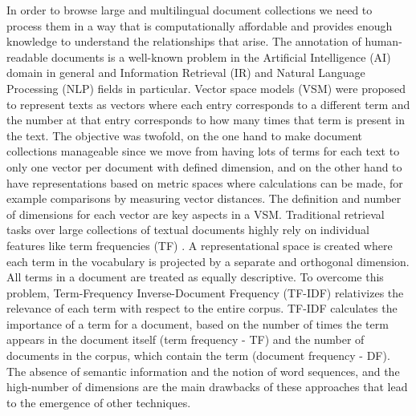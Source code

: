 In order to browse large and multilingual document collections we need to process them in a way that is computationally affordable and provides enough knowledge to understand the relationships that arise. The annotation of human-readable documents is a well-known problem in the Artificial Intelligence (AI) domain in general and Information Retrieval (IR) and Natural Language Processing (NLP) fields in particular. Vector space models (VSM) \citep{Salton1983} were proposed to represent texts as vectors where each entry corresponds to a different term and the number at that entry corresponds to how many times that term is present in the text. The objective was twofold, on the one hand to make document collections manageable since we move from having lots of terms for each text to only one vector per document with defined dimension, and on the other hand to have representations based on metric spaces where calculations can be made, for example comparisons by measuring vector distances. The definition and number of dimensions for each vector are key aspects in a VSM. Traditional retrieval tasks over large collections of textual documents highly rely on individual features like term frequencies (TF) \citep{Hearst1999}. A representational space is created where each term in the vocabulary is projected by a separate and orthogonal dimension. All terms in a document are treated as equally descriptive. To overcome this problem, Term-Frequency Inverse-Document Frequency (TF-IDF) \citep{Manning2008} relativizes the relevance of each term with respect to the entire corpus. TF-IDF calculates the importance of a term for a document, based on the number of times the term appears in the document itself (term frequency - TF) and the number of documents in the corpus, which contain the term (document frequency - DF). The absence of semantic information and the notion of word sequences, and the high-number of dimensions are the main drawbacks of these approaches that lead to the emergence of other techniques. 


